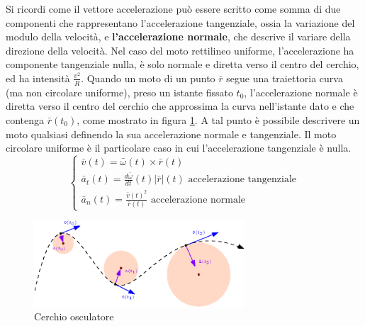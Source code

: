\documentclass[10pt, letterpaper]{report}
\begin{document}
Si ricordi come il vettore accelerazione può essere scritto come somma di due componenti 
che rappresentano l'accelerazione tangenziale, ossia la variazione del modulo della velocità, e 
\textbf{l'accelerazione normale}, che descrive il variare della direzione della velocità. Nel 
caso del moto rettilineo uniforme, l'accelerazione ha componente tangenziale nulla, è solo 
normale e diretta verso il centro del cerchio, ed ha intensità $\frac{v^2}{R}$.\acc 
Quando un moto di un punto $\bar r$ segue una traiettoria curva (ma non circolare uniforme), preso un istante 
fissato $t_0$, l'accelerazione normale è diretta verso il centro del cerchio che approssima la curva 
nell'istante dato e che contenga $\bar r(t_0)$, come mostrato in figura \ref{cerchioOsculante}.
\acc 
A tal punto è possibile descrivere un moto qualsiasi definendo la sua accelerazione normale 
e tangenziale. Il moto circolare uniforme è il particolare caso in cui l'accelerazione 
tangenziale è nulla. $$ \begin{cases}
    \bar v(t) = \bar \omega(t) \times \bar r(t)   \\ 
    \bar a_t(t)  = \frac{d\bar \omega}{dt}(t)|\bar r|(t) \text{ accelerazione tangenziale} \\ 
    \bar a_n(t) = \frac{\bar v(t)^2}{\bar r(t)}\text{ accelerazione normale}
\end{cases}$$
\begin{center}\begin{figure}[h!]
    \centering
    \includegraphics[width=0.7\textwidth]{images/cerchioOsculante.eps}
    \caption{Cerchio osculatore}
    \label{cerchioOsculante}
\end{figure} \end{center}
\end{document}
